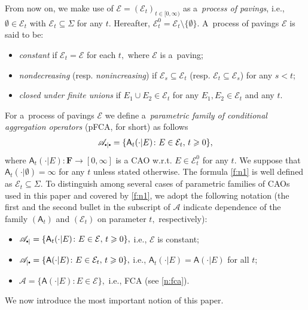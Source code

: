 \documentclass[preprint,11pt]{elsarticle}
\theoremstyle{definition}
\newcommand\mN{{\mathbb N}}
\newcommand\bF{\mathbf{F}} %
\newcommand\cE{{\mathcal E}}
\newcommand\sA{\mathsf{A}}
\newcommand\aA[2][E]{\sA(#2|#1)}%
\newcommand\aAd[3][E]{\sA_{#3}(#2|#1)}%
\newcommand\sbullet[1][.5]{\mathbin{\vcenter{\hbox{\scalebox{#1}{$\bullet$}}}}}
\newcommand\bA{\mathscr{A}}%
\newcommand\bpA{\mathscr {A}_{\sbullet|}}%
\newcommand\beA{\mathscr {A}_{|\sbullet}}%
\newcommand\bpeA{\mathscr {A}_{\sbullet|\sbullet}}%
\newcommand\bE{{\mathscr {E}}}
\renewcommand\ge{\geqslant}
\begin{document}
From now on, we make use of $\bE=(\cE_t)_{t\in [0,\infty)}$ as a~\textit{process of pavings}, i.e., $\emptyset\in \cE_t$ with $\cE_t\subseteq \Sigma$ for any $t.$
Hereafter, $\cE_t^0=\cE_t\setminus \{\emptyset\}.$
A~process of pavings  $\bE$ is said to be:
\begin{itemize}[noitemsep]
   \item \textit{constant} if $\cE_t=\cE$ for each $t,$ where $\cE$ is a~paving;
   \item  \textit{nondecreasing} (resp. \textit{nonincreasing}) if $\cE_s\subseteq \cE_t$  (resp. $\cE_t\subseteq \cE_s$) for any $s<t$;


   \item \textit{closed under finite unions} if $E_1\cup E_2\in \cE_t$ for any $E_1,E_2\in\cE_t$ and any $t.$
\end{itemize}


For a~process  of pavings $\bE$ we define a~\textit{parametric family of conditional aggregation operators} (pFCA, for short) as follows
\begin{align}\label{f:n1}
     \bpeA=\{\aAd{\cdot}{t}\colon E\in \cE_t, \, t\ge 0\},
\end{align}
where $\sA_t(\cdot|E)\colon \bF\to [0,\infty]$ is a CAO w.r.t. $E\in \cE_t^0$ for any $t.$
We suppose that $\aAd[\emptyset]{\cdot}{t}=\infty$ for any $t$ unless stated otherwise. The formula \eqref{f:n1} is well defined as $\cE_t\subseteq \Sigma.$
To distinguish among several cases of  parametric families of CAOs used in this paper and covered by \eqref{f:n1}, we adopt the following notation (the first and the second bullet in the subscript of $\bA$ indicate dependence of the family $(\sA_t)$ and $(\cE_t)$ on parameter $t,$ respectively):

\begin{itemize}[noitemsep]
    \item  $\bpA=\{\aAd{\cdot}{t}\colon E\in \cE, \, t\ge 0\},$ i.e., $\bE$ is constant;

    \item $\beA=\{\aA{\cdot}\colon E\in \cE_t, \, t\ge 0\},$ i.e., $\aAd{\cdot}{t}=\aA{\cdot}$ for all $t$;\label{p:pfca}

    \item $\bA=\{\aA{\cdot}\colon E\in \cE\},$ i.e., FCA (see \eqref{n:fca}).
\end{itemize}
We now introduce the most important notion of this paper.
\end{document}
